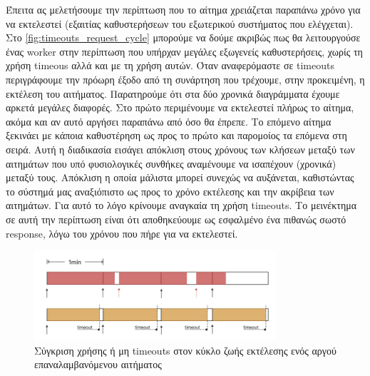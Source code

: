 Έπειτα ας μελετήσουμε την περίπτωση που το αίτημα χρειάζεται παραπάνω χρόνο για να εκτελεστεί (εξαιτίας καθυστερήσεων του εξωτερικού συστήματος που ελέγχεται).
Στο \autoref{fig:timeouts_request_cycle} μπορούμε να δούμε ακριβώς πως θα λειτουργούσε ένας worker στην περίπτωση που υπήρχαν μεγάλες εξωγενείς καθυστερήσεις, χωρίς τη χρήση
timeous αλλά και με τη χρήση αυτών. Όταν αναφερόμαστε σε timeouts περιγράφουμε την πρόωρη έξοδο από τη συνάρτηση που τρέχουμε, στην
προκειμένη, η εκτέλεση του αιτήματος. Παρατηρούμε ότι στα δύο χρονικά διαγράμματα έχουμε αρκετά μεγάλες διαφορές.
Στο πρώτο περιμένουμε να εκτελεστεί πλήρως το αίτημα, ακόμα και αν αυτό αργήσει παραπάνω από όσο
θα έπρεπε. Το επόμενο αίτημα ξεκινάει με κάποια καθυστέρηση ως προς το πρώτο και παρομοίος τα επόμενα στη σειρά.
Αυτή η διαδικασία εισάγει απόκλιση στους χρόνους των κλήσεων μεταξύ των αιτημάτων που υπό φυσιολογικές συνθήκες αναμένουμε να ισαπέχουν (χρονικά) μεταξύ τους.
Απόκλιση η οποία μάλιστα μπορεί συνεχώς να αυξάνεται, καθιστώντας το σύστημά μας αναξιόπιστο ως προς
το χρόνο εκτέλεσης και την ακρίβεια των αιτημάτων. Για αυτό το λόγο κρίνουμε αναγκαία τη χρήση timeouts.
Το μεινέκτημα σε αυτή την περίπτωση είναι ότι αποθηκεύουμε ως εσφαλμένο ένα πιθανώς σωστό response, λόγω του χρόνου που πήρε για να εκτελεστεί.

\begin{figure}[!ht]
	\centering
	\includegraphics[width=0.8\textwidth]{./images/chapter4/timeout_request_cycle.png}
	\caption[Σύγκριση χρήσης ή μη timeouts στον κύκλο ζωής εκτέλεσης ενός αργού επαναλαμβανόμενου αιτήματος]{Σύγκριση χρήσης ή μη timeouts στον κύκλο ζωής εκτέλεσης ενός αργού επαναλαμβανόμενου αιτήματος}
	\label{fig:timeouts_request_cycle}
\end{figure}

